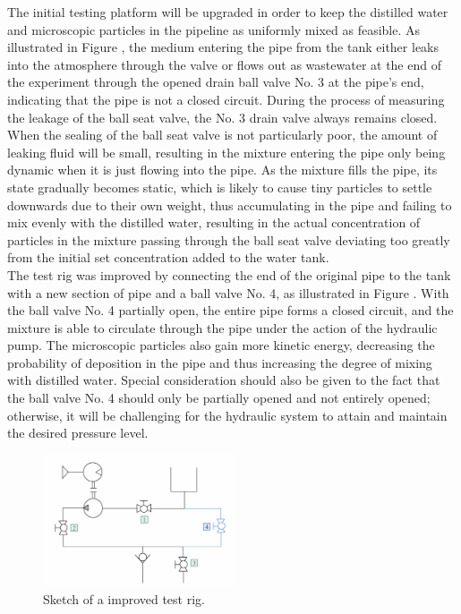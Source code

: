 The initial testing platform will be upgraded in order to keep the distilled water and microscopic
 particles in the pipeline as uniformly mixed as feasible. As illustrated in Figure , 
 the medium 
 entering the pipe from the tank either leaks into the atmosphere through the valve or flows out as 
 wastewater at the end of the experiment through the opened drain ball valve No. 3 at the pipe's end, 
 indicating that the pipe is not a closed circuit. During the process of measuring the leakage of the 
 ball seat valve, the No. 3 drain valve always remains closed. When the sealing of the ball seat valve 
 is not particularly poor, the amount of leaking fluid will be small, resulting in the mixture entering 
 the pipe only being dynamic when it is just flowing into the pipe. As the mixture fills the pipe, its 
 state gradually becomes static, which is likely to cause tiny particles to settle downwards due to their
  own weight, thus accumulating in the pipe and failing to mix evenly with the distilled water, resulting 
  in the actual concentration of particles in the mixture passing through the ball seat valve 
 deviating too greatly from the initial set concentration added to the water tank.\\

 The test rig was improved by connecting the end of the original pipe to the tank with a new section of
  pipe and a ball valve No. 4, as illustrated in Figure . With the ball valve No. 4 partially open, 
  the entire pipe forms a closed circuit, and the mixture is able to circulate through the pipe under 
  the action of the hydraulic pump. The microscopic particles also gain more kinetic energy, decreasing 
  the probability of deposition in the pipe and thus increasing the degree of mixing with distilled water. 
  Special consideration should also be given to the fact that the ball valve No. 4 should only be partially 
  opened and not entirely opened; otherwise, it will be challenging for the hydraulic system 
  to attain and maintain the desired pressure level.

  \begin{figure}[htbp]
    \centering
    \includegraphics[width=0.5\textwidth]{figures/TestRig/TestRig2.jpg}
    \caption{Sketch of a improved test rig.}
    \label{fig:TestRig2}
\end{figure}
